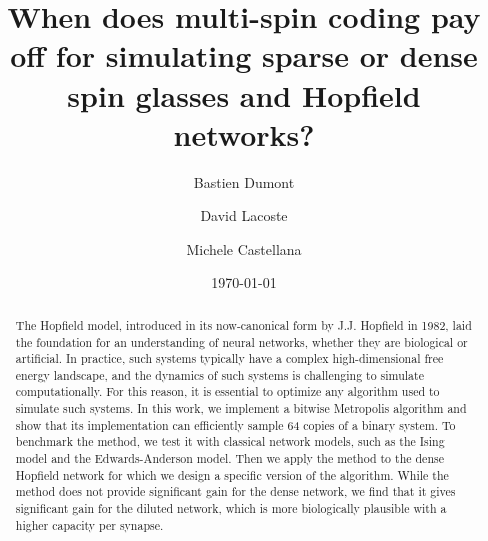 \documentclass[%
 reprint,
 superscriptaddress,
 amsmath,amssymb,
 aps,
 pre,
 floatfix,
]{revtex4-2}
\begin{document}
\modulolinenumbers[5]
\linenumbers

\title{When does multi-spin coding pay off for simulating sparse or dense spin glasses and Hopfield networks?}

\author{Bastien Dumont}

\author{David Lacoste}

\author{Michele Castellana}

\date{\today}

\begin{abstract}
The Hopfield model, introduced in its now-canonical form by J.J. Hopfield in 1982, laid the foundation for an understanding of neural networks, whether they are biological or artificial. In practice, such systems typically have a complex high-dimensional free energy landscape, and the dynamics of such systems is challenging to simulate computationally. For this reason, it is essential to optimize any algorithm used to simulate such systems. In this work, we implement a bitwise Metropolis algorithm and show that its implementation can efficiently sample 64 copies of a binary system. To benchmark the method, we test it with classical network models, such as the Ising model and the Edwards-Anderson model. Then we apply the method to the dense Hopfield network for which we design a specific version of the algorithm. While the method does not provide significant gain for the dense network, we find that it gives significant gain for the diluted network, which is more biologically plausible with a higher capacity per synapse.
\end{abstract}
\maketitle



\FloatBarrier

\FloatBarrier

\FloatBarrier



\setlength{\bibsep}{2pt}


\end{document}
